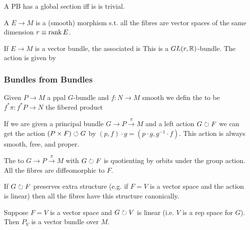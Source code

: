 \documentclass{article}
\begin{document}
\begin{lemma}
A PB has a global section iff is is trivial. 
\end{lemma}



\begin{definition}
A  $E \to M$ is a (smooth) morphism s.t. all the fibres are vector spaces of the same dimension $r\equiv\operatorname{rank} E$. 
\end{definition}

\begin{definition}
If $E \to M$ is a vector bundle, the associated  is 
This is a $GL(r,\mathbb{R})$-bundle. The action is given by 
\end{definition}

\subsubsection{Bundles from Bundles}
\begin{definition}
	Given $P \to M$ a ppal $G$-bundle and $f:N \to M$ smooth we defin the  to be 
	$f^\ast \pi : f^\ast P \to N$ the fibered product 
\end{definition}

If we are given a principal bundle $G \to P \overset{\pi}{\to} M$ and a left action $G \circlearrowright F$ we can get the action $(P \times F) \circlearrowleft G$ by $(p,f) \cdot g = (p\cdot g, g^{-1} \cdot f)$. This action is always smooth, free, and proper. 

\begin{definition}
The  to $G \to P \overset{\pi}{\to} M$ with $G \circlearrowright F$ is 
quotienting by orbits under the group action. All the fibres are diffeomorphic to $F$. 
\end{definition}

If $G \circlearrowright F$ preserves extra structure (e.g. if $F=V$ is a vector space and the action is linear) then all the fibres have this structure canonically. 

\begin{example}
Suppose $F=V$ is a vector space and $G \circlearrowright V$ is linear (i.e. $V$ is a rep space for $G$). Then $P_V$ is a vector bundle over $M$. 
\end{example}
\end{document}
